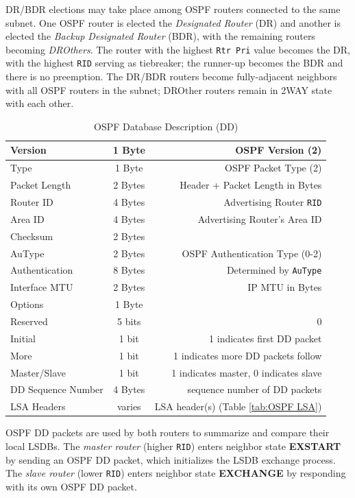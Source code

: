 \documentclass[12pt]{article}
\begin{document}
	 DR/BDR elections may take place among OSPF routers connected to the same subnet. One OSPF router is elected the \textit{Designated Router} (DR) and another is elected the \textit{Backup Designated Router} (BDR), with the remaining routers becoming \textit{DROthers}. The router with the highest \texttt{Rtr Pri} value becomes the DR, with the highest \texttt{RID} serving as tiebreaker; the runner-up becomes the BDR and there is no preemption. The DR/BDR routers become fully-adjacent neighbors with all OSPF routers in the subnet; DROther routers remain in 2WAY state with each other.

	\begin{table}[H]
	\centering
	\caption{OSPF Database Description (DD) \label{tab:OSPF DD}}
	\begin{tabular}{| l | c | r |}
	\hline
	Version			& 1 Byte	& OSPF Version (2)\\\hline
	Type				& 1 Byte	& OSPF Packet Type (2)\\\hline
	Packet Length		& 2 Bytes	& Header + Packet Length in Bytes\\\hline
	Router ID			& 4 Bytes	& Advertising Router \texttt{RID}\\\hline
	Area ID			& 4 Bytes	& Advertising Router's Area ID\\\hline
	Checksum			& 2 Bytes	&\\\hline
	AuType			& 2 Bytes	& OSPF Authentication Type (0-2)\\\hline
	Authentication		& 8 Bytes	& Determined by \texttt{AuType}\\\hline
	Interface MTU		& 2 Bytes	& IP MTU in Bytes\\\hline
	Options			& 1 Byte	&\\\hline
	Reserved			& 5 bits	& 0\\\hline
	Initial				& 1 bit 	& 1 indicates first DD packet\\\hline 
	More				& 1 bit 	& 1 indicates more DD packets follow\\\hline
	Master/Slave		& 1 bit 	& 1 indicates master, 0 indicates slave\\\hline
	DD Sequence Number	& 4 Bytes	& sequence number of DD packets\\\hline
	LSA Headers		& varies	& LSA header(s) (Table \ref{tab:OSPF LSA})\\\hline
	\end{tabular}\end{table}
	OSPF DD packets are used by both routers to summarize and compare their local LSDBs. The \textit{master router} (higher \texttt{RID}) enters neighbor state \textbf{EXSTART} by sending an OSPF DD packet, which initializes the LSDB exchange process. The \textit{slave router} (lower \texttt{RID}) enters neighbor state \textbf{EXCHANGE} by responding with its own OSPF DD packet.
\end{document}
